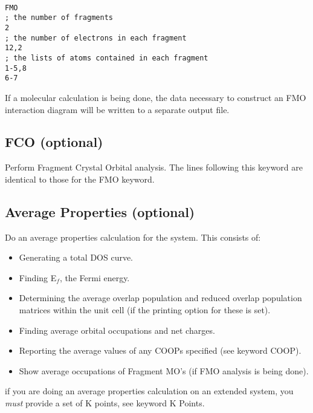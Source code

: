 \shrinkspacing
\begin{verbatim}

FMO
; the number of fragments
2
; the number of electrons in each fragment
12,2
; the lists of atoms contained in each fragment
1-5,8
6-7

\end{verbatim}
\resumespacing

If a molecular calculation is being done, the data necessary to
construct an FMO interaction diagram will be written to a separate
output file.

\subsection{{\sf FCO} (optional)}

Perform Fragment Crystal Orbital analysis.
The lines following this keyword are identical to those for the {\sf
FMO} keyword.


\subsection{{\sf Average Properties} (optional)}

Do an average properties calculation for the system.  This consists
of:

\begin{itemize}

\item Generating a total DOS curve.

\item Finding E$_f$, the Fermi energy.

\item Determining the average overlap population and reduced overlap
population matrices within the unit cell (if the printing option for
these is set).

\item Finding average orbital occupations and net charges.

\item Reporting the average values of any COOPs specified (see
keyword {\sf COOP}).

\item Show average occupations of Fragment MO's (if FMO analysis is
being done).

\end{itemize}

 if you are doing an average properties calculation on an
extended system, you
{\em must} provide a set of K points, see keyword {\sf K Points}.

